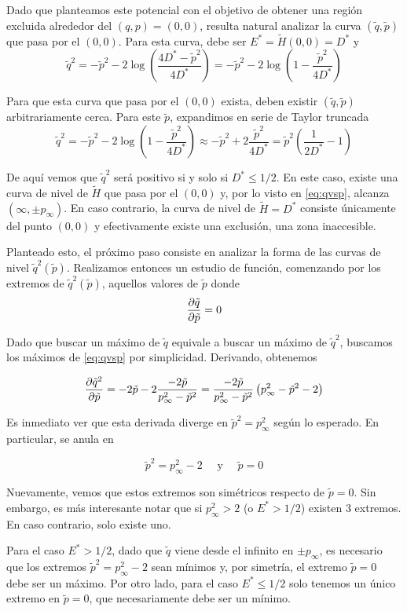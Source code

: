 Dado que planteamos este potencial con el objetivo de obtener una región excluida alrededor del $(q,p)=(0,0)$, resulta natural analizar la curva $(\tilde{q},\tilde{p})$ que pasa por el $(0,0)$.
Para esta curva, debe ser $E^* = \tilde{H}(0,0) = D^*$ y
\[ \tilde{q}^2 = -\tilde{p}^2 - 2\log\left( \frac{4D^*-\tilde{p}^2}{4D^*} \right)
= -\tilde{p}^2 - 2\log\left( 1-\frac{\tilde{p}^2}{4D^*} \right) \]

Para que esta curva que pasa por el $(0,0)$ exista, deben existir $(\tilde{q}, \tilde{p})$ arbitrariamente cerca.
Para este $\tilde{p}$, expandimos en serie de Taylor truncada
\[ \tilde{q}^2 = -\tilde{p}^2 - 2\log\left( 1-\frac{\tilde{p}^2}{4D^*} \right) \approx -\tilde{p}^2 + 2\frac{\tilde{p}^2}{4D^*}  = \tilde{p}^2 \left( \frac{1}{2D^*} -1 \right)\]

De aquí vemos que $\tilde{q}^2$ será positivo si y solo si $D^* \leq 1/2$.
En este caso, existe una curva de nivel de $\tilde{H}$ que pasa por el $(0,0)$ y, por lo visto en \eqref{eq:qvsp}, alcanza $(\infty, \pm p_\infty)$.
En caso contrario, la curva de nivel de $\tilde{H}= D^*$ consiste únicamente del punto $(0,0)$ y efectivamente existe una exclusión, una zona inaccesible.

Planteado esto, el próximo paso consiste en analizar la forma de las curvas de nivel $\tilde{q}^2(\tilde{p})$.
Realizamos entonces un estudio de función, comenzando por los extremos de $\tilde{q}^2(\tilde{p})$, aquellos valores de $\tilde{p}$ donde
\[ \frac{\partial\tilde{q}}{\partial\tilde{p}} = 0 \]

Dado que buscar un máximo de $\tilde{q}$ equivale a buscar un máximo de $\tilde{q}^2$, buscamos los máximos de \eqref{eq:qvsp} por simplicidad.
Derivando, obtenemos

\[\frac{\partial\tilde{q}^2}{\partial\tilde{p}} = -2\tilde{p} - 2\frac{-2\tilde{p}}{p_\infty^2-\tilde{p}^2}
= \frac{-2\tilde{p}}{p_\infty^2-\tilde{p}^2} \left( p_\infty^2-\tilde{p}^2 - 2 \right) \]

Es inmediato ver que esta derivada diverge en $\tilde{p}^2 = p^2_\infty$ según lo esperado.
En particular, se anula en 

\[ \tilde{p}^2 = p^2_\infty - 2 \quad \text{ y } \quad \tilde{p} = 0 \]

Nuevamente, vemos que estos extremos son simétricos respecto de $\tilde{p}=0$.
Sin embargo, es más interesante notar que si $p_\infty^2 > 2$ (o $E^* > 1/2$) existen 3 extremos.
En caso contrario, solo existe uno.

Para el caso $E^* > 1/2$, dado que $\tilde{q}$ viene desde el infinito en $\pm p_\infty$, es necesario que los extremos $\tilde{p}^2 = p_\infty^2 - 2$ sean mínimos y, por simetría, el extremo $\tilde{p}=0$ debe ser un máximo. Por otro lado, para el caso $E^*\leq 1/2$ solo tenemos un único extremo en $\tilde{p}=0$, que necesariamente debe ser un mínimo.

